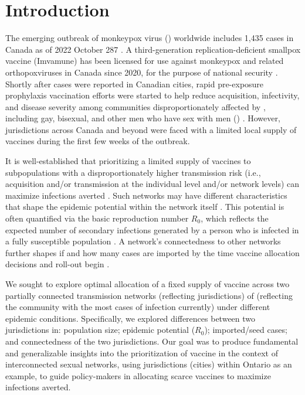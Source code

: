 \section{Introduction}
The emerging outbreak of monkeypox virus (\MPXV) worldwide includes
1,435 cases in Canada as of 2022 October 287 \cite{PHAC2022epi}.
A third-generation replication-deficient smallpox vaccine (Imvamune\rtm) has been
licensed for use against monkeypox and related orthopoxviruses in Canada since 2020,
for the purpose of national security \cite{NACI2022vax}.
Shortly after cases were reported in Canadian cities,
rapid pre-exposure prophylaxis vaccination efforts were started
to help reduce acquisition, infectivity, and disease severity
among communities disproportionately affected by \MPXV, including
gay, bisexual, and other men who have sex with men (\GBMSM) \cite{TPH2022vax,Olson2022}.
However, jurisdictions across Canada and beyond
were faced with a limited local supply of vaccines
during the first few weeks of the \MPXV outbreak.
\par
It is well-established that prioritizing a limited supply of vaccines
to subpopulations with a disproportionately higher transmission risk
(i.e., acquisition and/or transmission at the individual level and/or network levels)
can maximize infections averted \cite{Garnett2005,Mishra2021,Greenhalgh1986,Mylius2008}.
Such networks may have different characteristics that shape
the epidemic potential within the network itself \cite{Weiss2020}.
This potential is often quantified via the basic reproduction number $R_0$,
which reflects the expected number of secondary infections
generated by a person who is infected in a fully susceptible population \cite{EpiNow2}.
A network's connectedness to other networks further shapes
if and how many cases are imported
by the time vaccine allocation decisions and roll-out begin \cite{Keeling2005}.
\par
We sought to explore optimal allocation of a fixed supply of \MPXV vaccine
across two partially connected transmission networks (reflecting jurisdictions)
of \GBMSM (reflecting the community with the most cases of \MPXV infection currently)
under different epidemic conditions.
Specifically, we explored differences between two jurisdictions in:
\GBMSM population size; epidemic potential ($R_0$); imported/seed cases;
and connectedness of the two jurisdictions.
Our goal was to produce fundamental and generalizable insights into
the prioritization of \MPXV vaccine in the context of interconnected sexual networks,
using jurisdictions (cities) within Ontario as an example,
to guide policy-makers in allocating scarce vaccines to maximize infections averted.
